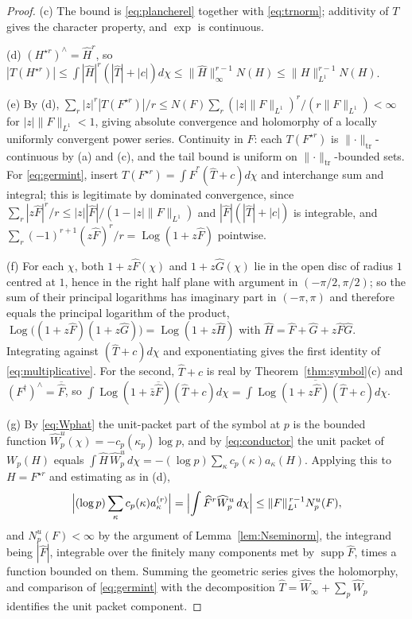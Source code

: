 \documentclass[11pt]{amsart}
\theoremstyle{definition}
\theoremstyle{remark}
\newcommand{\supp}{\operatorname{supp}}
\newcommand{\Th}{\widehat{T}}
\newcommand{\Wh}{\widehat{W}}
\newcommand{\Log}{\operatorname{Log}}
\begin{document}
\begin{proof}
(c)  The bound is \eqref{eq:plancherel} together with
\eqref{eq:trnorm}; additivity of $T$ gives the character property, and $\exp$
is continuous.

(d)  $(H^{\star r})^{\wedge}=\widehat H^{r}$, so
$|T(H^{\star r})|\le\int|\widehat H|^{r}(|\Th|+|c|)d\chi\le
\lVert\widehat H\rVert_{\infty}^{r-1}N(H)\le\lVert H\rVert_{L^{1}}^{r-1}N(H)$.

(e)  By (d),
$\sum_r|z|^{r}|T(F^{\star r})|/r\le N(F)\sum_r(|z|\lVert F\rVert_{L^1})^{r}/
(r\lVert F\rVert_{L^1})<\infty$ for $|z|\lVert F\rVert_{L^1}<1$, giving
absolute convergence and holomorphy of a locally uniformly convergent power
series.  Continuity in $F$: each $T(F^{\star r})$ is
$\lVert\cdot\rVert_{\mathrm{tr}}$-continuous by (a) and (c), and the tail bound
is uniform on $\lVert\cdot\rVert_{\mathrm{tr}}$-bounded sets.  For
\eqref{eq:germint}, insert $T(F^{\star r})=\int\widehat F^{r}(\Th+c)d\chi$ and
interchange sum and integral; this is legitimate by dominated convergence,
since $\sum_r|z\widehat F|^{r}/r\le|z||\widehat F|/(1-|z|\lVert
F\rVert_{L^1})$ and $|\widehat F|(|\Th|+|c|)$ is integrable, and
$\sum_r(-1)^{r+1}(z\widehat F)^{r}/r=\Log(1+z\widehat F)$ pointwise.

(f)  For each $\chi$, both $1+z\widehat F(\chi)$ and $1+z\widehat G(\chi)$ lie
in the open disc of radius $1$ centred at $1$, hence in the right half plane
with argument in $(-\pi/2,\pi/2)$; so the sum of their principal logarithms has
imaginary part in $(-\pi,\pi)$ and therefore equals the principal logarithm of
the product, $\Log\bigl((1+z\widehat F)(1+z\widehat G)\bigr)=\Log(1+z\widehat
H)$ with $\widehat H=\widehat F+\widehat G+z\widehat F\widehat G$.  Integrating
against $(\Th+c)d\chi$ and exponentiating gives the first identity of
\eqref{eq:multiplicative}.  For the second, $\Th+c$ is real by
Theorem~\ref{thm:symbol}(c) and $(F^{\dagger})^{\wedge}=\overline{\widehat F}$,
so $\int\Log(1+\bar z\overline{\widehat F})(\Th+c)d\chi=
\overline{\int\Log(1+z\widehat F)(\Th+c)d\chi}$.

(g)  By \eqref{eq:Wphat} the unit-packet part of the symbol at $p$ is the
bounded function $\widehat W^{u}_p(\chi)=-c_p(\kappa_p)\log p$, and by
\eqref{eq:conductor} the unit packet of $W_p(H)$ equals
$\int\widehat H\,\widehat W^{u}_p\,d\chi=-(\log p)\sum_{\kappa}
c_p(\kappa)a_{\kappa}(H)$.  Applying this to $H=F^{\star r}$ and estimating as
in (d),
\[
\Bigl|(\log p)\sum_{\kappa}c_p(\kappa)a^{(r)}_{\kappa}\Bigr|
=\Bigl|\int\widehat F^{r}\widehat W^{u}_p\,d\chi\Bigr|
\le\lVert F\rVert_{L^{1}}^{\,r-1}N^{u}_p(F),
\]
and $N^{u}_p(F)<\infty$ by the argument of Lemma~\ref{lem:Nseminorm}, the
integrand being $|\widehat F|$, integrable over the finitely many components
met by $\supp\widehat F$, times a function bounded on them.  Summing the
geometric series gives the holomorphy, and comparison of \eqref{eq:germint}
with the decomposition $\Th=\Wh_{\infty}+\sum_p\Wh_p$ identifies the unit
packet component.
\end{proof}
\end{document}
